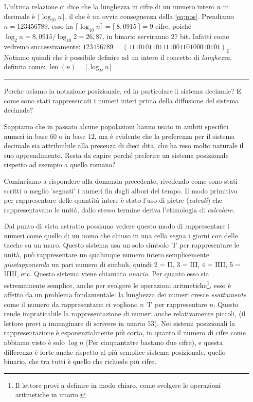 \begin{ex} 
L'ultima relazione ci dice che la lunghezza in cifre di un numero intero $n$ in
decimale è $\lceil\log_{10} n \rceil$, il che è un ovvia conseguenza della
\eqref{eq:pos}. Prendiamo $n = 123456789$, esso ha $\lceil \log_{10} n \rceil =
\lceil\, 8,0915 \,\rceil = 9$ cifre, poiché $\log_2{n} = 8,0915 / \log_{10}{2}
= 26,87$, in binario serviranno $27$ bit. Infatti come vedremo successivamente:
$123456789 = (111010110111100110100010101)_2$. Notiamo quindi che è possibile definire ad un intero il concetto di \emph{lunghezza}, definita come:
$\operatorname{len}(n) = \lceil \log_B n \rceil$
\end{ex}

{\hfill \rule{0.9\textwidth}{0.5pt} \hfill}
\small

Perche usiamo la notazione posizionale, ed in particolare il sistema decimale?
E come sono stati rappresentati i numeri interi prima della diffusione del
sistema decimale?

Sappiamo che in passato alcune popolazioni hanno usato in ambiti specifici
numeri in base $60$ o in base $12$, ma è evidente che la preferenza per il
sistema decimale sia attribuibile alla presenza di dieci dita, che ha reso
molto naturale il suo apprendimento. Resta da capire perché preferire un
sistema posizionale rispetto ad esempio a quello romano?

Cominciamo a rispondere alla domanda precedente, rivedendo come sono stati
scritti o meglio 'segnati' i numeri fin dagli albori del tempo. Il modo
primitivo per rappresentare delle quantità intere è stato l'uso di pietre
(\emph{calculi}) che rappresentavano le unità, dallo stesso termine deriva
l'etimologia di \emph{calcolare}.

Dal punto di vista astratto possiamo vedere questo modo di rappresentare i
numeri come quello di un uomo che chiuso in una cella segna i giorni con delle
tacche su un muro. Questo sistema usa un solo simbolo '\textsc{I}' per
rappresentare le unità, può rappresentare un qualunque numero intero
semplicemente \emph{giustapponendo} un pari numero di simboli, quindi 2 =
\textsc{II}, 3 = \textsc{III}, 4 = \textsc{IIII}, 5 = \textsc{IIIII}, etc.
Questo sistema viene chiamato \emph{unario}. Per quanto
esso sia estremamente semplice, anche per svolgere le operazioni
aritmetiche\footnote{Il lettore provi a definire in modo chiaro, come svolgere
le operazioni aritmetiche in unario.}, esso è affetto da un problema
fondamentale: la lunghezza dei numeri cresce \emph{esattamente} come il numero
da rappresentare: ci vogliono $n$ 'I' per rappresentare $n$. Questo rende
impraticabile la rappresentazione di numeri anche relativamente piccoli, (il
lettore provi a immaginare di scrivere in unario $53$). Nei sistemi posizionali
la rappresentazione è esponenzialmente più corta, in quanto il numero di cifre
come abbiamo visto è solo $\log n$ (Per cinquantatre bastano due cifre), e
questa differenza è forte anche rispetto al più semplice sistema posizionale,
quello binario, che tra tutti è quello che richiede più cifre.

